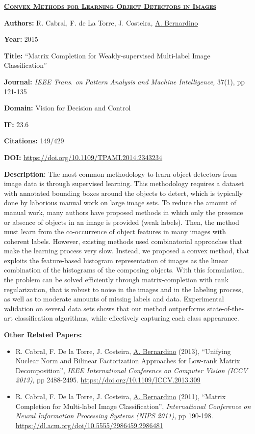 \documentclass[
]{article}
\begin{document}
\textbf{\textsc{\ul{Convex Methods for Learning Object Detectors in
Images}}}

\textbf{Authors:} R. Cabral, F. de La Torre, J. Costeira, \ul{A.
Bernardino}

\textbf{Year:} 2015

\textbf{Title:} ``Matrix Completion for Weakly-supervised Multi-label
Image Classification''

\textbf{Journal:} \emph{IEEE Trans. on} \emph{Pattern Analysis and
Machine Intelligence,} 37(1), pp 121-135

\textbf{Domain:} Vision for Decision and Control

\textbf{IF:} 23.6

\textbf{Citations:} 149/429

\textbf{DOI:} \url{https://doi.org/10.1109/TPAMI.2014.2343234}

\textbf{Description:} The most common methodology to learn object
detectors from image data is through supervised learning. This
methodology requires a dataset with annotated bounding boxes around the
objects to detect, which is typically done by laborious manual work on
large image sets. To reduce the amount of manual work, many authors have
proposed methods in which only the presence or absence of objects in an
image is provided (weak labels). Then, the method must learn from the
co-occurrence of object features in many images with coherent labels.
However, existing methods used combinatorial approaches that make the
learning process very slow. Instead, we proposed a convex method, that
exploits the feature-based histogram representation of images as the
linear combination of the histograms of the composing objects. With this
formulation, the problem can be solved efficiently through
matrix-completion with rank regularization, that is robust to noise in
the images and in the labeling process, as well as to moderate amounts
of missing labels and data. Experimental validation on several data sets
shows that our method outperforms state-of-the-art classification
algorithms, while effectively capturing each class appearance.

\textbf{Other Related Papers:}

\begin{itemize}
\item
  R. Cabral, F. De la Torre, J. Costeira, \ul{A. Bernardino} (2013),
  ``Unifying Nuclear Norm and Bilinear Factorization Approaches for
  Low-rank Matrix Decomposition'', \emph{IEEE International Conference
  on Computer Vision (ICCV 2013),} pp 2488-2495.
  \url{https://doi.org/10.1109/ICCV.2013.309}
\item
  R. Cabral, F. De la Torre, J. Costeira, \ul{A. Bernardino} (2011),
  ``Matrix Completion for Multi-label Image Classification'',
  \emph{International Conference on Neural Information Processing
  Systems} \emph{(NIPS 2011)}, pp 190-198.
  \url{https://dl.acm.org/doi/10.5555/2986459.2986481}
\end{itemize}
\end{document}
